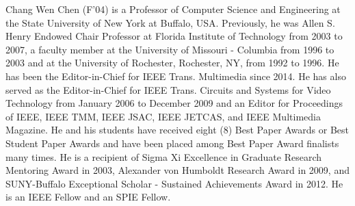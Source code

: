 \documentclass[journal,10pt]{IEEEtran}
\begin{document}
\vspace{-20em}
\begin{IEEEbiography}{Chang Wen Chen}
   (F'04) is a Professor of Computer Science and Engineering at the State University of New York at Buffalo, USA. Previously, he was Allen S. Henry Endowed Chair Professor at Florida Institute of Technology from 2003 to 2007, a faculty member at the University of Missouri - Columbia from 1996 to 2003 and at the University of Rochester, Rochester, NY, from 1992 to 1996. He has been the Editor-in-Chief for IEEE Trans. Multimedia since 2014. He has also served as the Editor-in-Chief for IEEE Trans. Circuits and Systems for Video Technology from January 2006 to December 2009 and an Editor for Proceedings of IEEE, IEEE TMM, IEEE JSAC, IEEE JETCAS, and IEEE Multimedia Magazine. He and his students have received eight (8) Best Paper Awards or Best Student Paper Awards and have been placed among Best Paper Award finalists many times. He is a recipient of Sigma Xi Excellence in Graduate Research Mentoring Award in 2003, Alexander von Humboldt Research Award in 2009, and SUNY-Buffalo Exceptional Scholar - Sustained Achievements Award in 2012. He is an IEEE Fellow and an SPIE Fellow. 
\end{IEEEbiography}%
 







\end{document}
